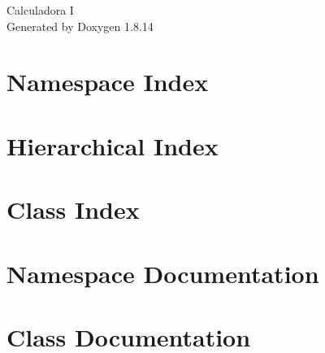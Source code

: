 \documentclass[twoside]{book}
\newcommand{\+}{\discretionary{\mbox{\scriptsize$\hookleftarrow$}}{}{}}
\newcommand{\clearemptydoublepage}{%
  \newpage{\pagestyle{empty}\cleardoublepage}%
}
\begin{document}
\hypersetup{pageanchor=false,
             bookmarksnumbered=true,
             pdfencoding=unicode
            }
\begin{titlepage}
\vspace*{7cm}
\begin{center}%
{\Large Calculadora I }\\
\vspace*{1cm}
{\large Generated by Doxygen 1.8.14}\\
\end{center}
\end{titlepage}
\clearemptydoublepage
{}
\tableofcontents
\clearemptydoublepage
{}
\hypersetup{pageanchor=true}

\chapter{Namespace Index}

\chapter{Hierarchical Index}

\chapter{Class Index}

\chapter{Namespace Documentation}

\chapter{Class Documentation}


\backmatter
\newpage
{}
\clearemptydoublepage
{}
\printindex
\end{document}
